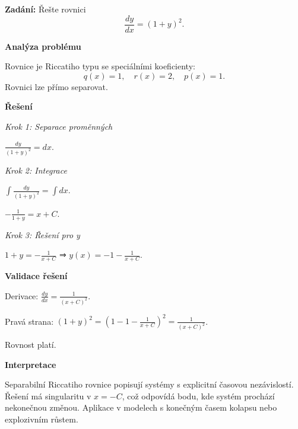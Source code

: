         \begin{example}
        \label{ex:a3-lehky-separabilni}
        
        \noindent\textbf{Zadání:} Řešte rovnici
        \[
        \frac{dy}{dx} = (1 + y)^2.
        \]
        
        \vspace{1.5\baselineskip}
        
        \noindent\textbf{Analýza problému}
        
        \noindent Rovnice je Riccatiho typu se speciálními koeficienty:
        \[
        q(x) = 1, \quad r(x) = 2, \quad p(x) = 1.
        \]
        Rovnici lze přímo separovat.
        
        \vspace{1.5\baselineskip}
        
        \noindent\textbf{Řešení}
        
        \noindent\textit{Krok 1: Separace proměnných}
        
        $\frac{dy}{(1 + y)^2} = dx$.
        
        \noindent\textit{Krok 2: Integrace}
        
        $\int \frac{dy}{(1 + y)^2} = \int dx$.
        
        $-\frac{1}{1 + y} = x + C$.
        
        \noindent\textit{Krok 3: Řešení pro y}
        
        $1 + y = -\frac{1}{x + C}$ ⇒ $y(x) = -1 - \frac{1}{x + C}$.
        
        \vspace{1.5\baselineskip}
        
        \noindent\textbf{Validace řešení}
        
        Derivace: $\frac{dy}{dx} = \frac{1}{(x + C)^2}$.
        
        Pravá strana: $(1 + y)^2 = \left(1 - 1 - \frac{1}{x + C}\right)^2 = \frac{1}{(x + C)^2}$.
        
        Rovnost platí.
        
        \vspace{1.5\baselineskip}
        
        \noindent\textbf{Interpretace}
        
        Separabilní Riccatiho rovnice popisují systémy s explicitní časovou nezávislostí. 
        Řešení má singularitu v $x = -C$, což odpovídá bodu, kde systém prochází 
        nekonečnou změnou. Aplikace v modelech s konečným časem kolapsu nebo explozivním růstem.
        
        \end{example}
        
